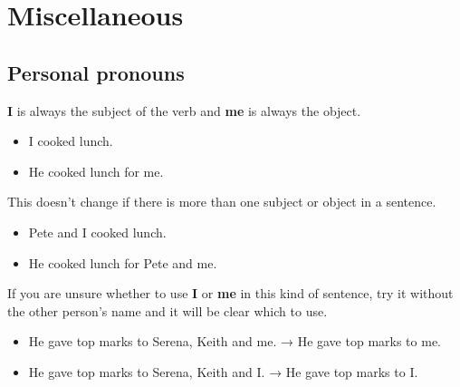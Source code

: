 \documentclass[11pt,a4paper]{book}
\newcommand{\xmark}{{\color{cadmiumred}\ding{54}}}%
\newcommand{\cmark}{{\color{green(html/cssgreen)}\checkmark}}%
\begin{document}
				\chapter{Miscellaneous}
				\section{Personal pronouns}
					\textbf{I} is always the subject of the verb and \textbf{me} is always the object.
						{\firasans \begin{mdframed}[backgroundcolor=aliceblue] \begin{itemize}[label=\cmark]
							\item I cooked lunch.
							\item He cooked lunch for me.
						\end{itemize} \end{mdframed} }
					This doesn't change if there is more than one subject or object in a sentence.
						{\firasans \begin{mdframed}[backgroundcolor=aliceblue] \begin{itemize}[label=\cmark]
							\item Pete and I cooked lunch.
							\item He cooked lunch for Pete and me.
						\end{itemize} \end{mdframed} }
					If you are unsure whether to use \textbf{I} or \textbf{me} in this kind of sentence, try it without the other person's name and it will be clear which to use.
						{\firasans \begin{mdframed}[backgroundcolor=aliceblue] \begin{itemize}[label=\cmark]
							\item He gave top marks to Serena, Keith and me. → He gave top marks to me.
							\item[\xmark] He gave top marks to Serena, Keith and I. → He gave top marks to I.
						\end{itemize} \end{mdframed} }
\end{document}
